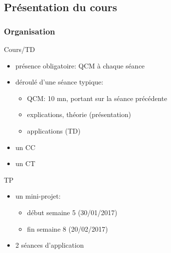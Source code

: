 


\begin{reveals}
		
\maketitle


\section{Présentation du cours}

\begin{frame}
  \frametitle{Organisation}

  \vfill

  \begin{block}{Cours/TD}
    \begin{itemize}
    \item présence obligatoire: QCM à chaque séance
    \item déroulé d'une séance typique:
      \begin{itemize}
      \item QCM: 10 mn, portant sur la séance précédente 
      \item explications, théorie (présentation)
      \item applications (TD)
      \end{itemize}
    \item un CC
    \item un CT
    \end{itemize}
  \end{block}

  \vfill

  \begin{block}{TP}
    \begin{itemize}
    \item un mini-projet:
      \begin{itemize}
      \item début semaine 5 (30/01/2017)
      \item fin semaine 8 (20/02/2017)
      \end{itemize}
    \item 2 séances d'application
    \end{itemize}
  \end{block}

  \vfill
\end{frame}


\end{reveals}
